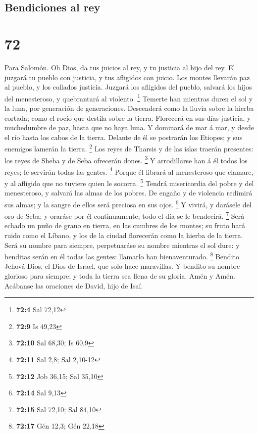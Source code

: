 \hypertarget{bendiciones-al-rey}{%
\subsection{Bendiciones al rey}\label{bendiciones-al-rey}}

\hypertarget{section-71}{%
\section{72}\label{section-71}}

 Para Salomón. Oh Dios, da tus juicios al rey, y tu justicia
al hijo del rey.  El juzgará tu pueblo con justicia, y tus
afligidos con juicio.  Los montes llevarán paz al pueblo, y
los collados justicia.  Juzgará los afligidos del pueblo,
salvará los hijos del menesteroso, y quebrantará al violento.
\footnote{\textbf{72:4} Sal 72,12}  Temerte han mientras
duren el sol y la luna, por generación de generaciones. 
Descenderá como la lluvia sobre la hierba cortada; como el rocío que
destila sobre la tierra.  Florecerá en sus días justicia, y
muchedumbre de paz, hasta que no haya luna.  Y dominará de
mar á mar, y desde el río hasta los cabos de la tierra. 
Delante de él se postrarán los Etiopes; y sus enemigos lamerán la
tierra. \footnote{\textbf{72:9} Is 49,23}  Los reyes de
Tharsis y de las islas traerán presentes: los reyes de Sheba y de Seba
ofrecerán dones. \footnote{\textbf{72:10} Sal 68,30; Is 60,9}
 Y arrodillarse han á él todos los reyes; le servirán todas
las gentes. \footnote{\textbf{72:11} Sal 2,8; Sal 2,10-12} 
Porque él librará al menesteroso que clamare, y al afligido que no
tuviere quien le socorra. \footnote{\textbf{72:12} Job 36,15; Sal 35,10}
 Tendrá misericordia del pobre y del menesteroso, y salvará
las almas de los pobres.  De engaño y de violencia redimirá
sus almas; y la sangre de ellos será preciosa en sus ojos. \footnote{\textbf{72:14}
  Sal 9,13}  Y vivirá, y darásele del oro de Seba; y
oraráse por él continuamente; todo el día se le bendecirá. \footnote{\textbf{72:15}
  Sal 72,10; Sal 84,10}  Será echado un puño de grano en
tierra, en las cumbres de los montes; su fruto hará ruido como el
Líbano, y los de la ciudad florecerán como la hierba de la tierra.
 Será su nombre para siempre, perpetuaráse su nombre
mientras el sol dure: y benditas serán en él todas las gentes: llamarlo
han bienaventurado. \footnote{\textbf{72:17} Gén 12,3; Gén 22,18}
 Bendito Jehová Dios, el Dios de Israel, que solo hace
maravillas.  Y bendito su nombre glorioso para siempre: y
toda la tierra sea llena de su gloria. Amén y Amén. 
Acábanse las oraciones de David, hijo de Isaí.

